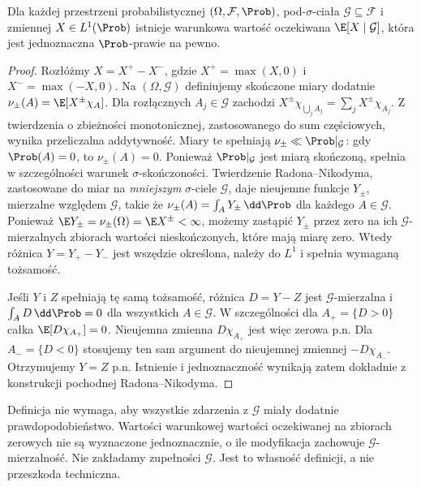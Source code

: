 \begin{twierdzenie}
Dla każdej przestrzeni probabilistycznej
$(\Omega,\mathcal F,\Prob)$, pod-$\sigma$-ciała
$\mathcal G\subseteq\mathcal F$ i zmiennej
$X\in L^1(\Prob)$ istnieje warunkowa wartość
oczekiwana $\E[X\mid\mathcal G]$, która jest
jednoznaczna $\Prob$-prawie na pewno.
\end{twierdzenie}
\begin{proof}
Rozłóżmy $X=X^+-X^-$, gdzie
$X^+=\max(X,0)$ i $X^-=\max(-X,0)$.
Na $(\Omega,\mathcal G)$ definiujemy skończone
miary dodatnie $\nu_\pm(A)=\E[X^\pm\chi_{A}]$.
Dla rozłącznych $A_j\in\mathcal G$ zachodzi
$X^\pm\chi_{\bigcup_j A_j}=\sum_j X^\pm\chi_{A_j}$.
Z twierdzenia o zbieżności monotonicznej, zastosowanego
do sum częściowych, wynika przeliczalna addytywność.
Miary te spełniają $\nu_\pm\ll\Prob|_\mathcal G$:
gdy $\Prob(A)=0$, to $\nu_\pm(A)=0$.
Ponieważ $\Prob|_{\mathcal G}$ jest miarą skończoną,
spełnia w szczególności warunek $\sigma$-skończoności.
Twierdzenie Radona--Nikodyma, zastosowane do miar
na \emph{mniejszym} $\sigma$-ciele $\mathcal G$,
daje nieujemne funkcje $Y_\pm$, mierzalne względem
$\mathcal G$, takie że
$\nu_\pm(A)=\int_A Y_\pm\,\dd\Prob$ dla
każdego $A\in\mathcal G$. Ponieważ
$\E Y_\pm=\nu_\pm(\Omega)=\E X^\pm<\infty$,
możemy zastąpić $Y_\pm$ przez zero na ich
$\mathcal G$-mierzalnych zbiorach wartości nieskończonych,
które mają miarę zero. Wtedy różnica
$Y=Y_+-Y_-$ jest wszędzie określona, należy do $L^1$ i spełnia
wymaganą tożsamość.

Jeśli $Y$ i $Z$ spełniają tę samą tożsamość,
różnica $D=Y-Z$ jest $\mathcal G$-mierzalna i
$\int_A D\,\dd\Prob=0$ dla wszystkich
$A\in\mathcal G$. W szczególności dla
$A_+=\{D>0\}$ całka $\E[D\chi_{A_+}]=0$.
Nieujemna zmienna $D\chi_{A_+}$ jest więc zerowa
p.n. Dla $A_-=\{D<0\}$ stosujemy ten sam argument
do nieujemnej zmiennej $-D\chi_{A_-}$.
Otrzymujemy $Y=Z$ p.n. Istnienie i jednoznaczność
wynikają zatem dokładnie z konstrukcji pochodnej
Radona--Nikodyma.
\end{proof}

\begin{uwaga}
Definicja nie wymaga, aby wszystkie zdarzenia
z $\mathcal G$ miały dodatnie prawdopodobieństwo.
Wartości warunkowej wartości oczekiwanej na zbiorach
zerowych nie są wyznaczone jednoznacznie, o ile
modyfikacja zachowuje $\mathcal G$-mierzalność.
Nie zakładamy zupełności $\mathcal G$. Jest to
własność definicji, a nie przeszkoda techniczna.
\end{uwaga}

